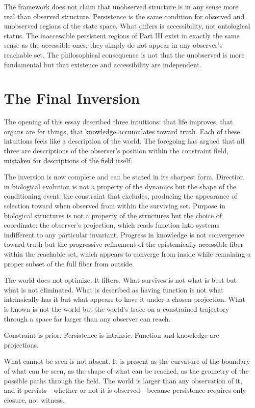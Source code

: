 \documentclass[12pt, a4paper, oneside]{article}
\theoremstyle{plain}
\theoremstyle{definition}
\theoremstyle{remark}
\begin{document}
The framework does not claim that unobserved structure is in any sense more real than observed structure. Persistence is the same condition for observed and unobserved regions of the state space. What differs is accessibility, not ontological status. The inaccessible persistent regions of Part III exist in exactly the same sense as the accessible ones; they simply do not appear in any observer's reachable set. The philosophical consequence is not that the unobserved is more fundamental but that existence and accessibility are independent.

\section{The Final Inversion}

The opening of this essay described three intuitions: that life improves, that organs are for things, that knowledge accumulates toward truth. Each of these intuitions feels like a description of the world. The foregoing has argued that all three are descriptions of the observer's position within the constraint field, mistaken for descriptions of the field itself.

The inversion is now complete and can be stated in its sharpest form. Direction in biological evolution is not a property of the dynamics but the shape of the conditioning event: the constraint that excludes, producing the appearance of selection toward when observed from within the surviving set. Purpose in biological structures is not a property of the structures but the choice of coordinate: the observer's projection, which reads function into systems indifferent to any particular invariant. Progress in knowledge is not convergence toward truth but the progressive refinement of the epistemically accessible fiber within the reachable set, which appears to converge from inside while remaining a proper subset of the full fiber from outside.

The world does not optimize. It filters. What survives is not what is best but what is not eliminated. What is described as having function is not what intrinsically has it but what appears to have it under a chosen projection. What is known is not the world but the world's trace on a constrained trajectory through a space far larger than any observer can reach.

Constraint is prior. Persistence is intrinsic. Function and knowledge are projections.

What cannot be seen is not absent. It is present as the curvature of the boundary of what can be seen, as the shape of what can be reached, as the geometry of the possible paths through the field. The world is larger than any observation of it, and it persists---whether or not it is observed---because persistence requires only closure, not witness.
\end{document}
